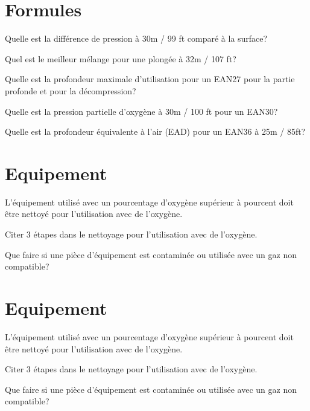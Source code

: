 \documentclass[english,12pt,a4paper]{article}
\begin{document}
	\section{Formules}
	\begin{outline}
	\1 Quelle est la différence de pression à 30m / 99 ft comparé à la surface?

	\1 Quel est le meilleur mélange pour une plongée à 32m / 107 ft?

	\1 Quelle est la profondeur maximale d'utilisation pour un EAN27 pour la partie profonde et pour la décompression?

	\1 Quelle est la pression partielle d'oxygène à 30m / 100 ft pour un EAN30?

	\1 Quelle est la profondeur équivalente à l'air (EAD) pour un EAN36 à 25m / 85ft?
	\end{outline}
	\pagebreak

	\section{Equipement}
	\begin{outline}
		\1 L'équipement utilisé avec un pourcentage d'oxygène supérieur à \underline{\hspace{1.5cm}} pourcent doit être nettoyé pour l'utilisation avec de l'oxygène.

		\1 Citer 3 étapes dans le nettoyage pour l'utilisation avec de l'oxygène.

		\1 Que faire si une pièce d'équipement est contaminée ou utilisée avec un gaz non compatible?
	\end{outline}
	\pagebreak

	\section{Equipement}
	\begin{outline}
		\1 L'équipement utilisé avec un pourcentage d'oxygène supérieur à \underline{\hspace{1.5cm}} pourcent doit être nettoyé pour l'utilisation avec de l'oxygène.

		\1 Citer 3 étapes dans le nettoyage pour l'utilisation avec de l'oxygène.

		\1 Que faire si une pièce d'équipement est contaminée ou utilisée avec un gaz non compatible?
	\end{outline}
\end{document}

